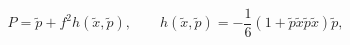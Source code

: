 \begin{equation}
\label{Eq:P-perturbation}
P=\tilde p  + f^2 h(\tilde x ,\tilde p),\qquad
h(\tilde  x,\tilde p)
=-\frac{1}{6}(1+
\tilde  p\tilde x\tilde  p\tilde x )\tilde p,
\end{equation}

